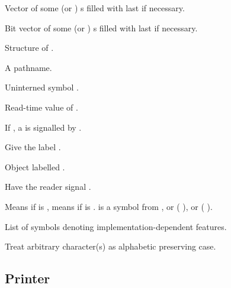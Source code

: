 \begin{LIST}{1cm}
  {
  \index{\#(}%
  Vector of some (or )
  s filled with last  if necessary.
  }

  {
  Bit vector of some (or )
  s filled with last  if necessary.
  }

  {
  Structure of .
  }

  {
  A pathname.
  }

  {
  Uninterned symbol .
  }

  {
  Read-time value of .
  }

  {
  If \NIL, a  is signalled by .
  }

  {
  \index{\#=}%
  Give  the label .
  }

  {
  \index{\#\#}%
  Object labelled .
  }

  \IT{\KWD{\#\boldmath$<$}\qquad\qquad\qquad}
  {
  Have the reader signal .
  }

  {
  Means  if  is \T, means
   if  is \NIL.  is a
  symbol from , or (
  ), or ( ).
  }

  {
  List of symbols denoting implementation-dependent features.
  }

  {
    Treat arbitrary character(s)  as alphabetic preserving case.
  }
    \index{\@{$\backslash$}}%

\end{LIST}


\subsection{Printer} 



